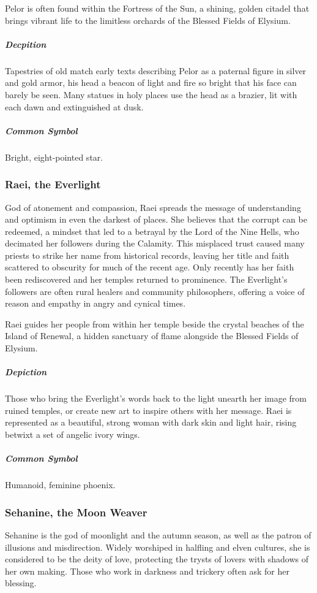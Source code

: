 \documentclass[letterpaper, twocolumn, openany, nodeprecatedcode, layout=true]{dndbook}
\begin{document}
Pelor is often found within the Fortress of the Sun, a shining, golden citadel that brings
vibrant life to the limitless orchards of the Blessed Fields of Elysium.

\subparagraph{Decpition}
Tapestries of old match early texts describing Pelor as a paternal figure in silver and
gold armor, his head a beacon of light and fire so bright that his face can barely be seen.
Many statues in holy places use the head as a brazier, lit with each dawn and extinguished
at dusk.

\subparagraph{Common Symbol}
Bright, eight-pointed star.

\subsubsection{Raei, the Everlight}

God of atonement and compassion, Raei spreads the message of understanding and optimism in
even the darkest of places. She believes that the corrupt can be redeemed, a mindset that led
to a betrayal by the Lord of the Nine Hells, who decimated her followers during the Calamity.
This misplaced trust caused many priests to strike her name from historical records, leaving
her title and faith scattered to obscurity for much of the recent age. Only recently has her
faith been rediscovered and her temples returned to prominence. The Everlight’s followers are
often rural healers and community philosophers, offering a voice of reason and empathy in
angry and cynical times.

Raei guides her people from within her temple beside the crystal beaches of the Island of
Renewal, a hidden sanctuary of flame alongside the Blessed Fields of Elysium.

\subparagraph{Depiction}
Those who bring the Everlight’s words back to the light unearth her image from ruined temples,
or create new art to inspire others with her message. Raei is represented as a beautiful,
strong woman with dark skin and light hair, rising betwixt a set of angelic ivory wings.

\subparagraph{Common Symbol}
Humanoid, feminine phoenix.

\subsubsection{Sehanine, the Moon Weaver}

Sehanine is the god of moonlight and the autumn season, as well as the patron of illusions
and misdirection. Widely worshiped in halfling and elven cultures, she is considered to be
the deity of love, protecting the trysts of lovers with shadows of her own making. Those who
work in darkness and trickery often ask for her blessing.
\end{document}
